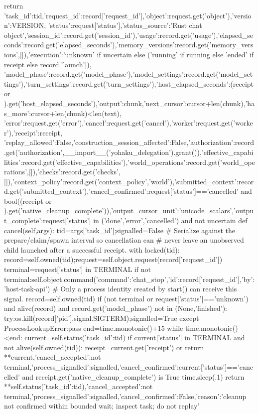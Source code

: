         return {'task_id':tid,'request_id':record['request_id'],'object':request.get('object'),'version':VERSION,
                'status':request['status'],'status_source':'Rust chat object','session_id':record.get('session_id'),'usage':record.get('usage'),'elapsed_seconds':record.get('elapsed_seconds'),'memory_versions':record.get('memory_versions',[]),'execution':'unknown' if uncertain else ('running' if running else 'ended' if receipt else record['launch']),
                'model_phase':record.get('model_phase'),'model_settings':record.get('model_settings'),'turn_settings':record.get('turn_settings'),'host_elapsed_seconds':(receipt or {}).get('host_elapsed_seconds'),'output':chunk,'next_cursor':cursor+len(chunk),'has_more':cursor+len(chunk)<len(text),
                'error':request.get('error'),'cancel':request.get('cancel'),'worker':request.get('worker'),'receipt':receipt,
                'replay_allowed':False,'construction_session_affected':False,'authorization':record.get('authorization',__import__('yohaku_delegation').grant()),'effective_capabilities':record.get('effective_capabilities'),'world_operations':record.get('world_operations',[]),'checks':record.get('checks',[]),'context_policy':record.get('context_policy','world'),'submitted_context':record.get('submitted_context'),'cancel_confirmed':request['status']=='cancelled' and bool((receipt or {}).get('native_cleanup_complete')),'output_cursor_unit':'unicode_scalars','output_complete':request['status'] in ('done','error','cancelled') and not uncertain}
    def cancel(self,args):
        tid=args['task_id'];signalled=False
        # Serialize against the prepare/claim/spawn interval so cancellation can
        # never leave an unobserved child launched after a successful receipt.
        with locked(tid):
            record=self.owned(tid);request=self.object.request(record['request_id'])
            terminal=request['status'] in TERMINAL
            if not terminal:self.object.command({'command':'chat_stop','id':record['request_id'],'by':'host-task-api'})
        # Only a process identity created by start() can receive this signal.
        record=self.owned(tid)
        if (not terminal or request['status']=='unknown') and alive(record) and record.get('model_phase') not in (None,'finished'):
            try:os.kill(record['pid'],signal.SIGTERM);signalled=True
            except ProcessLookupError:pass
        end=time.monotonic()+15
        while time.monotonic()<end:
            current=self.status({'task_id':tid})
            if current['status'] in TERMINAL and not alive(self.owned(tid)):
                receipt=current.get('receipt') or {}
                return {**current,'cancel_accepted':not terminal,'process_signalled':signalled,'cancel_confirmed':current['status']=='cancelled' and receipt.get('native_cleanup_complete') is True}
            time.sleep(.1)
        return {**self.status({'task_id':tid}),'cancel_accepted':not terminal,'process_signalled':signalled,'cancel_confirmed':False,'reason':'cleanup not confirmed within bounded wait; inspect task; do not replay'}



